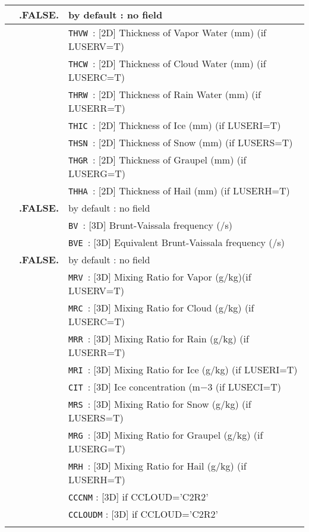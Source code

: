 \begin{center}
\begin{makeimage}
\begin{tabular}{|>{\centering}p{3cm}|>{\centering}p{2.5cm}|p{11cm}|}
\hline
\multirow{8}{*}{LTHW}\index{LTHW!\innam{NAM\_DIAG}}&\textbf{.FALSE.} & by default : no field \\\cline{2-3}
&\multirow{7}{*}{.TRUE.} &{\tt THVW }: [2D] Thickness of Vapor Water (mm) (if LUSERV=T)\\\cline{3-3}
& &{\tt THCW }: [2D] Thickness of Cloud Water (mm) (if LUSERC=T)\\\cline{3-3}
& &{\tt THRW }: [2D] Thickness of Rain Water (mm) (if LUSERR=T)\\\cline{3-3}
& &{\tt THIC }: [2D] Thickness of Ice (mm) (if LUSERI=T)\\\cline{3-3}
& &{\tt THSN }: [2D] Thickness of Snow (mm) (if LUSERS=T)\\\cline{3-3}
& &{\tt THGR }: [2D] Thickness of Graupel (mm) (if LUSERG=T)\\\cline{3-3}
& &{\tt THHA }: [2D] Thickness of Hail (mm) (if LUSERH=T) \\ \hline
\hline
\multirow{3}{*}{LBV\_FR}\index{LBV\_FR!\innam{NAM\_DIAG}}&\textbf{.FALSE.} & by default : no field \\\cline{2-3}
&\multirow{2}{*}{.TRUE.} &{\tt BV }: [3D] Brunt-Vaissala frequency (/s)\\\cline{3-3}
& &{\tt  BVE }: [3D] Equivalent Brunt-Vaissala frequency (/s)\\ \hline
\hline
\multirow{10}{*}{LVAR\_MRW}\index{LVAR\_MRW!\innam{NAM\_DIAG}}&\textbf{.FALSE.} & by default : no field\\\cline{2-3}
&\multirow{9}{*}{.TRUE.} &{\tt MRV }: [3D] Mixing Ratio for Vapor (g/kg)(if LUSERV=T)\\\cline{3-3}
& &{\tt MRC }: [3D] Mixing Ratio for Cloud (g/kg) (if LUSERC=T)\\\cline{3-3}
& &{\tt MRR }: [3D] Mixing Ratio for Rain (g/kg) (if LUSERR=T)\\\cline{3-3}
& &{\tt MRI }: [3D] Mixing Ratio for Ice (g/kg) (if LUSERI=T)\\\cline{3-3}
& &{\tt CIT }: [3D] Ice concentration (m${-3}$ (if LUSECI=T)\\\cline{3-3}
& &{\tt MRS }: [3D] Mixing Ratio for Snow (g/kg) (if LUSERS=T)\\\cline{3-3}
& &{\tt MRG }: [3D] Mixing Ratio for Graupel (g/kg) (if LUSERG=T)\\\cline{3-3}
& &{\tt MRH }: [3D] Mixing Ratio for Hail (g/kg) (if LUSERH=T)\\\cline{3-3}
& &{\tt CCCNM} : [3D] if CCLOUD='C2R2' \\\cline{3-3}
& &{\tt CCLOUDM} : [3D] if CCLOUD='C2R2' \\\cline{3-3}

\end{tabular}
\end{makeimage}
\end{center}
